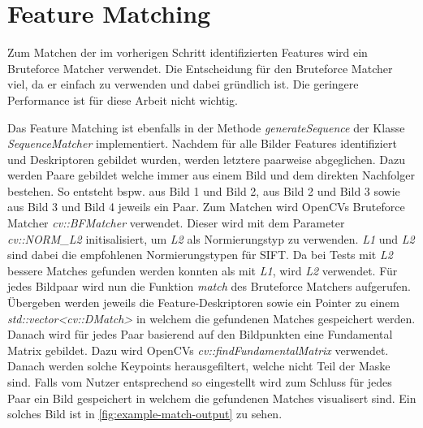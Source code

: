 \section{Feature Matching}
Zum Matchen der im vorherigen Schritt identifizierten Features wird ein Bruteforce Matcher verwendet.
Die Entscheidung für den Bruteforce Matcher viel, da er einfach zu verwenden und dabei gründlich ist.
Die geringere Performance ist für diese Arbeit nicht wichtig.

Das Feature Matching ist ebenfalls in der Methode \emph{generateSequence} der Klasse \emph{SequenceMatcher} implementiert.
Nachdem für alle Bilder Features identifiziert und Deskriptoren gebildet wurden, werden letztere paarweise abgeglichen.
Dazu werden Paare gebildet welche immer aus einem Bild und dem direkten Nachfolger bestehen.
So entsteht bspw. aus Bild 1 und Bild 2, aus Bild 2 und Bild 3 sowie aus Bild 3 und Bild 4 jeweils ein Paar.
Zum Matchen wird OpenCVs Bruteforce Matcher \emph{cv::BFMatcher} verwendet.
Dieser wird mit dem Parameter \emph{cv::NORM\_L2} initisalisiert, um \emph{L2} als Normierungstyp zu verwenden.
\emph{L1} und \emph{L2} sind dabei die empfohlenen Normierungstypen für SIFT.
Da bei Tests mit \emph{L2} bessere Matches gefunden werden konnten als mit \emph{L1}, wird \emph{L2} verwendet.
Für jedes Bildpaar wird nun die Funktion \emph{match} des Bruteforce Matchers aufgerufen.
Übergeben werden jeweils die Feature-Deskriptoren sowie ein Pointer zu einem \emph{std::vector<cv::DMatch>} in welchem die gefundenen Matches gespeichert werden.
Danach wird für jedes Paar basierend auf den Bildpunkten eine Fundamental Matrix gebildet.
Dazu wird OpenCVs \emph{cv::findFundamentalMatrix} verwendet.
Danach werden solche Keypoints herausgefiltert, welche nicht Teil der Maske sind.
Falls vom Nutzer entsprechend so eingestellt wird zum Schluss für jedes Paar ein Bild gespeichert in welchem die gefundenen Matches visualisert sind.
Ein solches Bild ist in \autoref{fig:example-match-output} zu sehen.